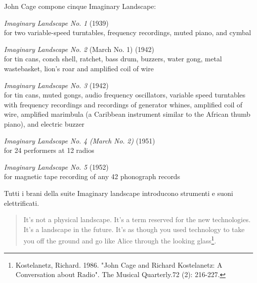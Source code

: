 John Cage compone cinque Imaginary Landscape:

\begin{compactitem}
	\item \emph{Imaginary Landscape No. 1} (1939) \\ for two variable-speed
	      turntables, frequency recordings, muted piano, and cymbal
	\item \emph{Imaginary Landscape No. 2} (March No. 1) (1942) \\ for tin cans,
	      conch shell, ratchet, bass drum, buzzers, water gong, metal wastebasket,
				lion's roar and amplified coil of wire
	\item \emph{Imaginary Landscape No. 3} (1942) \\ for tin cans, muted gongs, audio
	      frequency oscillators, variable speed turntables with frequency recordings
				and recordings of generator whines, amplified coil of wire, amplified
				marimbula (a Caribbean instrument similar to the African thumb piano), and electric buzzer
	\item \emph{Imaginary Landscape No. 4 (March No. 2)} (1951) \\ for 24
	      performers at 12 radios
	\item \emph{Imaginary Landscape No. 5} (1952) \\ for magnetic tape recording of
	      any 42 phonograph records
\end{compactitem}

Tutti i brani della suite Imaginary landscape introducono strumenti e suoni
elettrificati.

\begin{quote}
It's not a physical landscape. It's a term reserved for the new technologies.
It's a landscape in the future. It's as though you used technology to take you
off the ground and go like Alice through the looking glass\footnote{Kostelanetz,
Richard. 1986. "John Cage and Richard Kostelanetz: A Conversation about Radio".
The Musical Quarterly.72 (2): 216-227.}.
\end{quote}







